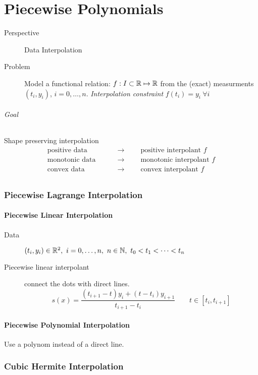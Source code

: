 \part{Piecewise Polynomials}
\begin{description}
 \item[Perspective] Data Interpolation
 \item[Problem] Model a functional relation: $f:I \subset \mathbb{R} \mapsto \mathbb{R}$ from the (exact) measurments $(t_i, y_i)$, $i = 0, \ldots, n$. \emph{Interpolation constraint} $f(t_i) = y_i \ \forall i$
\end{description}

\paragraph{Goal} Shape preserving interpolation
	\begin{align*}
	 \text{positive data} \qquad &\rightarrow \qquad \text{positive interpolant } f\\
	 \text{monotonic data} \qquad &\rightarrow \qquad \text{monotonic interpolant } f\\
	 \text{convex data}\qquad  &\rightarrow \qquad \text{convex interpolant }f\\
	\end{align*}


\section{Piecewise Lagrange Interpolation}
	\subsection{Piecewise Linear Interpolation}
		\begin{description}
		\item[Data] $(t_i,y_i) \in \mathbb{R}^2,\ i=0, \ldots, n,\ n \in \mathbb{N},\ t_0 < t_1 <\cdots <t_n$
		\item[Piecewise linear interpolant] connect the dots with direct lines.
			\[
			s(x) = \frac{(t_{i+1}-t)y_i + (t-t_i)y_{i+1}}{t_{i+1}-t_i} \qquad t\in [t_i, t_{i+1}]
			\]
		\end{description}
		
	\subsection{Piecewise Polynomial Interpolation}
		Use a polynom instead of a direct line.


\section{Cubic Hermite Interpolation}

